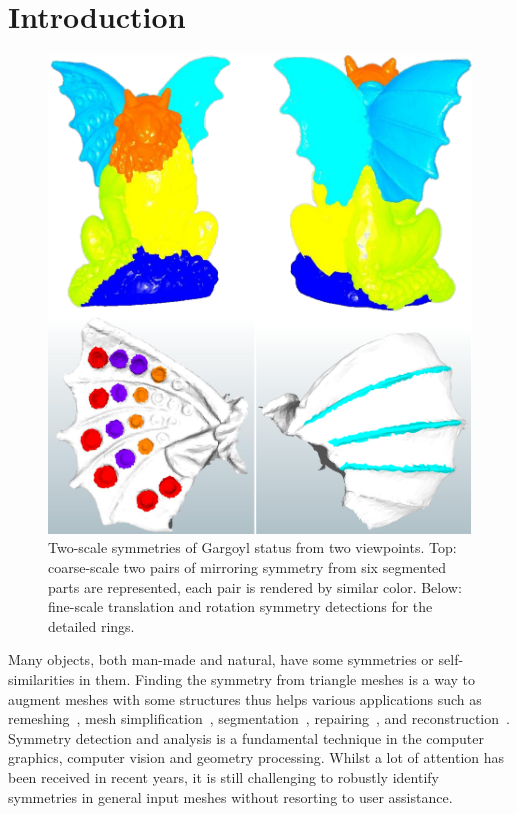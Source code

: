 \section{Introduction}
\label{sec:intro}

\begin{figure}[t]
\centering
  \includegraphics[width=0.99\linewidth]{figures/Gargoyl.pdf}
  \caption{Two-scale symmetries of Gargoyl status from two viewpoints.
  Top: coarse-scale two pairs of mirroring symmetry from six segmented parts are represented, each pair is rendered by similar color.
  Below: fine-scale translation and rotation symmetry detections for the detailed rings.}
\label{fig:Gargoyl}
\end{figure}

Many objects, both man-made and natural, have some symmetries or self-similarities in them.
Finding the symmetry from triangle meshes is a way to augment meshes with some structures thus helps various applications such as remeshing~\cite{podolak2006}, mesh simplification~\cite{pauly2008}, segmentation~\cite{mitra2006,xu2009}, repairing~\cite{bokeloh2009,berner2011}, and reconstruction~\cite{zabrodsky1997}.
Symmetry detection and analysis is a fundamental technique in the computer graphics, computer vision and geometry processing.
Whilst a lot of attention has been received in recent years, it is still challenging to robustly identify symmetries in general input meshes without resorting to user assistance.

